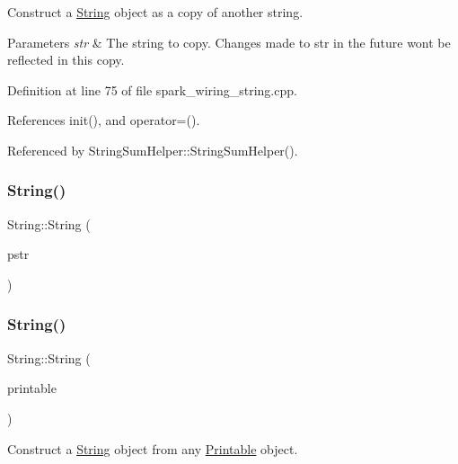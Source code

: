 Construct a \hyperlink{class_string}{String} object as a copy of another string. 


\begin{DoxyParams}{Parameters}
{\em str} & The string to copy. Changes made to str in the future won\textquotesingle{}t be reflected in this copy. \\
\hline
\end{DoxyParams}


Definition at line 75 of file spark\+\_\+wiring\+\_\+string.\+cpp.



References init(), and operator=().



Referenced by String\+Sum\+Helper\+::\+String\+Sum\+Helper().

\mbox{\label{class_string_a8c89c89e3cb69407bf55443c3d9dce0c}} 
\subsubsection{\texorpdfstring{String()}{String()}\hspace{0.1cm}{\footnotesize\ttfamily [4/13]}}
{\footnotesize\ttfamily String\+::\+String (\begin{DoxyParamCaption}\item[{const \+\_\+\+\_\+\+Flash\+String\+Helper $\ast$}]{pstr }\end{DoxyParamCaption})}

\mbox{\label{class_string_ad61d0ac2a1ff6e81fc7da8097be3c4dd}} 
\subsubsection{\texorpdfstring{String()}{String()}\hspace{0.1cm}{\footnotesize\ttfamily [5/13]}}
{\footnotesize\ttfamily String\+::\+String (\begin{DoxyParamCaption}\item[{const \hyperlink{class_printable}{Printable} \&}]{printable }\end{DoxyParamCaption})}



Construct a \hyperlink{class_string}{String} object from any \hyperlink{class_printable}{Printable} object. 


